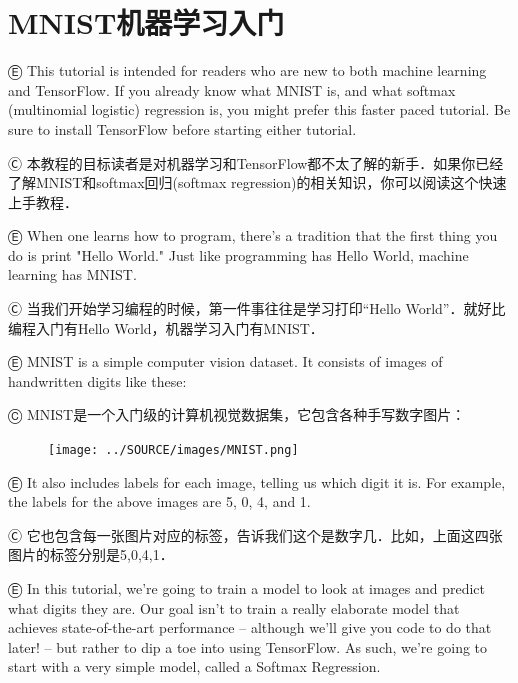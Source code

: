 


\newpage
\section {MNIST机器学习入门}\label{MINIST_beginner}

Ⓔ \textcolor{etc}{This tutorial is intended for readers who are new to both machine learning and TensorFlow. If you already know what MNIST is, and what softmax (multinomial logistic) regression is, you might prefer this faster paced tutorial. Be sure to install TensorFlow before starting either tutorial.}

Ⓒ 本教程的目标读者是对机器学习和TensorFlow都不太了解的新手．如果你已经了解MNIST和softmax回归(softmax regression)的相关知识，你可以阅读这个快速上手教程．

Ⓔ \textcolor{etc}{When one learns how to program, there's a tradition that the first thing you do is print "Hello World." Just like programming has Hello World, machine learning has MNIST.}

Ⓒ 当我们开始学习编程的时候，第一件事往往是学习打印“Hello World”．就好比编程入门有Hello World，机器学习入门有MNIST．

Ⓔ \textcolor{etc}{MNIST is a simple computer vision dataset. It consists of images of handwritten digits like these:}

Ⓒ MNIST是一个入门级的计算机视觉数据集，它包含各种手写数字图片：

\begin{figure}[htbp]
\centering
\texttt{[image: ../SOURCE/images/MNIST.png]}
\caption{}
\end{figure}

Ⓔ \textcolor{etc}{It also includes labels for each image, telling us which digit it is. For example, the labels for the above images are 5, 0, 4, and 1.}

Ⓒ 它也包含每一张图片对应的标签，告诉我们这个是数字几．比如，上面这四张图片的标签分别是5,0,4,1．

Ⓔ \textcolor{etc}{In this tutorial, we're going to train a model to look at images and predict what digits they are. Our goal isn't to train a really elaborate model that achieves state-of-the-art performance -- although we'll give you code to do that later! -- but rather to dip a toe into using TensorFlow. As such, we're going to start with a very simple model, called a Softmax Regression.}

